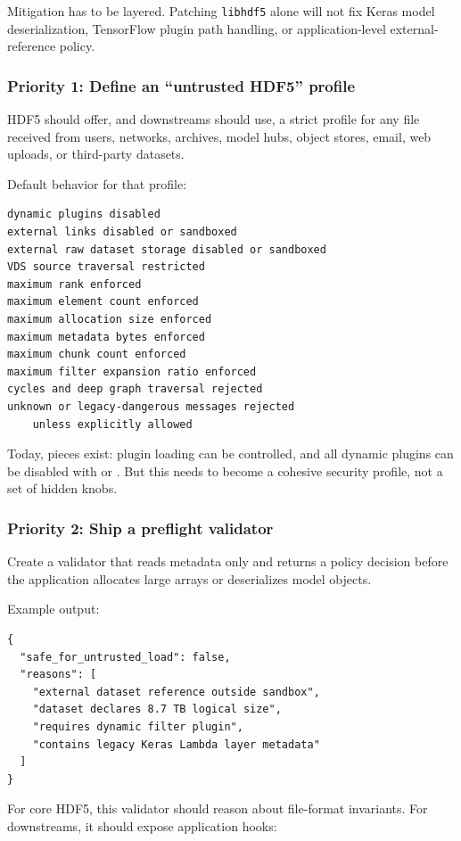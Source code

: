 \documentclass[../main.tex]{subfiles}
\begin{document}
Mitigation has to be layered. Patching \texttt{libhdf5}
alone will not fix Keras model deserialization, TensorFlow plugin
path handling, or application-level external-reference policy.

\subsubsection*{Priority 1: Define an “untrusted HDF5” profile}

HDF5 should offer, and downstreams should use, a strict profile
for any file received from users, networks, archives, model hubs,
object stores, email, web uploads, or third-party datasets.

Default behavior for that profile:
\begin{verbatim}
dynamic plugins disabled
external links disabled or sandboxed
external raw dataset storage disabled or sandboxed
VDS source traversal restricted
maximum rank enforced
maximum element count enforced
maximum allocation size enforced
maximum metadata bytes enforced
maximum chunk count enforced
maximum filter expansion ratio enforced
cycles and deep graph traversal rejected
unknown or legacy-dangerous messages rejected
    unless explicitly allowed    
\end{verbatim}

Today, pieces exist: plugin loading can be controlled, and all dynamic plugins
can be disabled with  or .
But this needs to become a cohesive security profile, not a set of hidden knobs.

\subsubsection*{Priority 2: Ship a preflight validator}

Create a validator that reads metadata only and returns a policy decision before the application allocates large arrays or deserializes model objects.

Example output:
\begin{verbatim}
{
  "safe_for_untrusted_load": false,
  "reasons": [
    "external dataset reference outside sandbox",
    "dataset declares 8.7 TB logical size",
    "requires dynamic filter plugin",
    "contains legacy Keras Lambda layer metadata"
  ]
}    
\end{verbatim}

For core HDF5, this validator should reason about file-format invariants.
For downstreams, it should expose application hooks:
\end{document}
